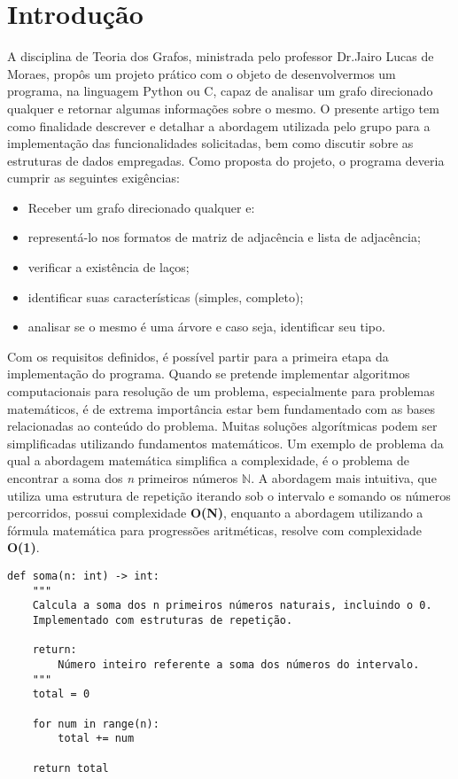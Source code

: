 

\section{Introdução}
A disciplina de Teoria dos Grafos, ministrada pelo professor Dr.Jairo Lucas de Moraes, propôs um projeto prático com o 
objeto de desenvolvermos um programa, na linguagem Python ou C, capaz de analisar um grafo direcionado qualquer e 
retornar algumas informações sobre o mesmo. O presente artigo tem como finalidade descrever e detalhar a abordagem 
utilizada pelo grupo para a implementação das funcionalidades solicitadas, bem como discutir sobre as estruturas de 
dados empregadas. Como proposta do projeto, o programa deveria cumprir as seguintes exigências:
\begin{itemize}
	\item Receber um grafo direcionado qualquer e:
	\item representá-lo nos formatos de matriz de adjacência e lista de adjacência;
	\item verificar a existência de laços;
	\item identificar suas características (simples, completo);
	\item analisar se o mesmo é uma árvore e caso seja, identificar seu tipo.
\end{itemize}

Com os requisitos definidos, é possível partir para a primeira etapa da implementação do programa. Quando se pretende 
implementar algoritmos computacionais para resolução de um problema, especialmente para problemas matemáticos, é de 
extrema importância estar bem fundamentado com as bases relacionadas ao conteúdo do problema. Muitas soluções 
algorítmicas podem ser simplificadas utilizando fundamentos matemáticos. Um exemplo de problema da qual a abordagem 
matemática simplifica a complexidade, é o problema de encontrar a soma dos \textit{n} primeiros números $\mathbb{N}$. A 
abordagem mais intuitiva, que utiliza uma estrutura de repetição iterando sob o intervalo e somando os números
percorridos, possui complexidade \textbf{O(N)}, enquanto a abordagem utilizando a fórmula matemática para progressões 
aritméticas, resolve com complexidade \textbf{O(1)}.

\begin{lstlisting}[caption={Função soma com complexidade linear}, label={lst:somaOn}]
def soma(n: int) -> int:
    """
    Calcula a soma dos n primeiros números naturais, incluindo o 0.
    Implementado com estruturas de repetição.

    return:
        Número inteiro referente a soma dos números do intervalo.
    """
    total = 0
    
    for num in range(n):
        total += num

    return total
\end{lstlisting}

